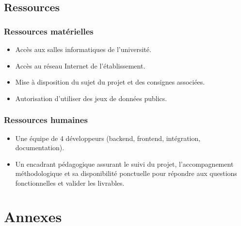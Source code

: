 \documentclass[a4paper,12pt]{report}
\begin{document}
\section{Ressources}
\label{rssrc}
\subsection{Ressources matérielles}
\begin{itemize}
    \item Accès aux salles informatiques de l’université.
    \item Accès au réseau Internet de l’établissement.
    \item Mise à disposition du sujet du projet et des consignes associées.
    \item Autorisation d’utiliser des jeux de données publics.
\end{itemize}

\subsection{Ressources humaines}
\begin{itemize}
    \item Une équipe de 4 développeurs (backend, frontend, intégration, documentation).
    \item Un encadrant pédagogique assurant le suivi du projet, l’accompagnement méthodologique et sa disponibilité ponctuelle pour répondre aux questions fonctionnelles et valider les livrables.
\end{itemize}


\chapter*{Annexes}
\setcounter{figure}{0} %
\renewcommand{\thefigure}{A.\arabic{figure}} %
\setcounter{table}{0} %
\renewcommand{\thetable}{A.\arabic{table}} %
\end{document}
